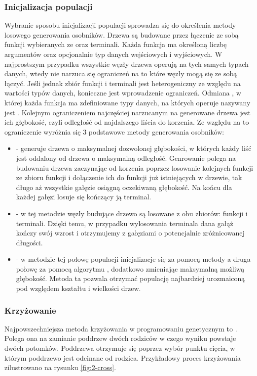\subsubsection{Inicjalizacja populacji}
Wybranie sposobu inicjalizacji populacji sprowadza się do określenia metody losowego generowania osobników. Drzewa są budowane przez łączenie ze sobą funkcji wybieranych ze  oraz terminali. Każda funkcja ma określoną liczbę argumentów oraz opcjonalnie typ danych wejściowych i wyjściowych. W najprostszym przypadku wszystkie węzły drzewa operują na tych samych typach danych, wtedy nie narzuca się ograniczeń na to które węzły mogą się ze sobą łączyć. Jeśli jednak zbiór funkcji i terminali jest heterogeniczny ze względu na wartości typów danych, konieczne jest wprowadzenie ograniczeń. Odmiana , w której każda funkcja ma zdefiniowane typy danych, na których operuje nazywany jest .
Kolejnym ograniczeniem najczęściej narzucanym na generowane drzewa jest ich głębokość, czyli odległość od najdalszego liścia do korzenia. Ze względu na to ograniczenie wyróżnia się 3 podstawowe metody generowania osobników:
\begin{itemize}
	\item {} - generuje drzewa o maksymalnej dozwolonej głębokości, w których każdy liść jest oddalony od drzewa o maksymalną odległość. Genrowanie polega na budowaniu drzewa zaczynając od korzenia poprzez losowanie kolejnych funkcji ze zbioru funkcji i dołączenie ich do funkcji już istniejących w drzewie, tak długo aż wszystkie gałęzie osiągną oczekiwaną głębokość. Na końcu dla każdej gałęzi losuje się kończący ją terminal.
	\item {} - w tej metodzie węzły budujące drzewo są losowane z obu zbiorów: funkcji i terminali. Dzięki temu, w przypadku wylosowania terminala dana gałąż kończy swój wzrost i otrzymujemy z gałęziami o potencjalnie zróżnicowanej długości.
	\item {} - w metodzie tej połowę populacji inicjalizacje się za pomocą metody  a druga połowę za pomocą algorytmu , dodatkowo zmieniając maksymalną możliwą głębokość. Metoda ta pozwala otrzymać populację najbardziej urozmaiconą pod względem kształtu i wielkości drzew.
\end{itemize}


\subsubsection{Krzyżowanie}
Najpowszechniejsza metoda krzyżowania w programowaniu genetycznym to . Polega ona na zamianie poddrzew dwóch rodziców w czego wyniku powstaje dwóch potomków. Poddrzewa otrzymuje się poprzez wybór punktu cięcia, w którym poddrzewo jest odcinane od rodzica. Przykładowy proces krzyżowania zilustrowano na rysunku \ref{fig:2-cross}.

